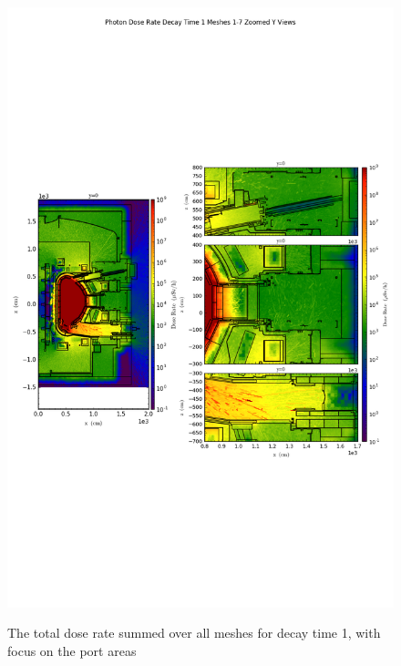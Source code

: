 \documentclass[12pt]{article}
\begin{document}
\begin{figure}[ht!]
\centering
\includegraphics[trim={0cm 9cm 0cm 10cm},clip,scale=0.75]{../plots/final_model/Photon_Dose_Rate_Decay_Time_1_Meshes_1-7_Zoomed_Y_Views.png}
\label{fig:photons_dc1_b4c_total_zoomed}
\caption{The total dose rate summed over all meshes for decay time 1, with focus on the port areas}
\end{figure}
\end{document}
